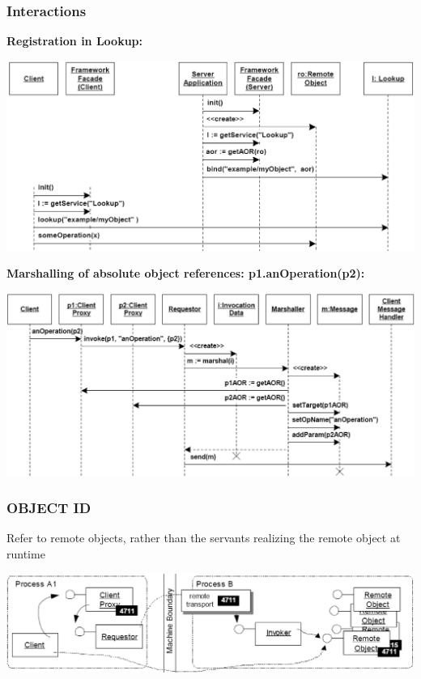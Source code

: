 \documentclass[10pt]{article}
\begin{document}
\subsubsection{Interactions}
\textbf{Registration in Lookup:}
\begin{center}
	\includegraphics[scale=0.3]{interactions-registration.png}
\end{center}
\textbf{Marshalling of absolute object references: p1.anOperation(p2):}
\begin{center}
	\includegraphics[scale=0.2]{interactions-marshalling.png}
\end{center}
\subsubsection{OBJECT ID}
Refer to remote objects, rather than the servants realizing the remote
object at runtime
\begin{center}
	\includegraphics[scale=0.2]{objectId.png}
\end{center}
\end{document}
